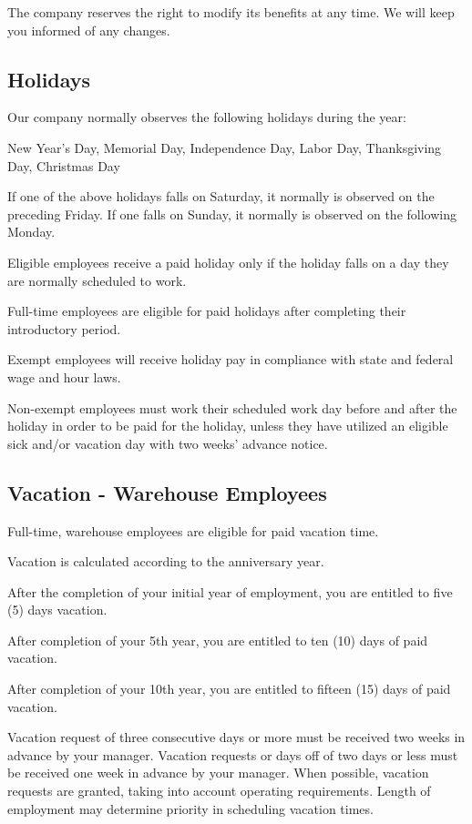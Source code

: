 \documentclass{book}
\begin{document}
The company reserves the right to modify its benefits at any time. We will keep you informed of any changes.

\subsection{Holidays}

Our company normally observes the following holidays during the year:

New Year's Day, Memorial Day, Independence Day, Labor Day, Thanksgiving Day, Christmas Day

If one of the above holidays falls on Saturday, it normally is observed on the preceding Friday. If one falls on Sunday, it normally is observed on the following Monday.

Eligible employees receive a paid holiday only if the holiday falls on a day they are normally scheduled to work.

Full-time employees are eligible for paid holidays after completing their introductory period.

Exempt employees will receive holiday pay in compliance with state and federal wage and hour laws.

Non-exempt employees must work their scheduled work day before and after the holiday in order to be paid for the holiday, unless they have utilized an eligible sick and/or vacation day with two weeks’ advance notice.

\subsection{Vacation - Warehouse Employees}

Full-time, warehouse employees are eligible for paid vacation time.

Vacation is calculated according to the anniversary year.

After the completion of your initial year of employment, you are entitled to five (5) days vacation.

After completion of your 5th year, you are entitled to ten (10) days of paid vacation.

After completion of your 10th year, you are entitled to fifteen (15) days of paid vacation.

Vacation request of three consecutive days or more must be received two weeks in advance by your manager. Vacation requests or days off of two days or less must be received one week in advance by your manager. When possible, vacation requests are granted, taking into account operating requirements. Length of employment may determine priority in scheduling vacation times.
\end{document}
